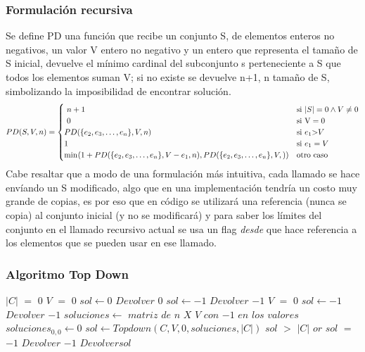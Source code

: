 \documentclass[8pt,a4paper]{article}
\begin{document}
\bigskip
\subsubsection{Formulación recursiva}
Se define PD una función que recibe un conjunto S, de elementos enteros no negativos, un valor V entero no negativo y un entero que representa el tamaño de S inicial, devuelve el mínimo cardinal del subconjunto s perteneciente a S que todos los elementos suman V; si no existe se devuelve n+1, n tamaño de S, simbolizando la imposibilidad de encontrar solución. \\
\[
\begin{array}{@{} r @{} c @{} l @{} }
&PD(S, V, n)&{}=\displaystyle
\begin{cases}
\ n+1 &\text{si } \text |S| = 0 \wedge V \neq 0 
\\
\ 0 &\text{si } \text V = 0 
\\
PD($\{$e_{2},e_{3},\dots,e_{n}$\}$,V,n)  &\text{si } e_{1} $>$ V
\\
1 &\text{si } e_{1} = V
\\
\min_{} (1 + PD($\{$e_{2},e_{3},\dots,e_{n}$\}$, V - e_{1}, n),PD($\{$e_{2},e_{3},\dots,e_{n}$\}$, V, ))&\text{otro caso }
\\
\end{cases}
\end{array}
\]
Cabe resaltar que a modo de una formulación más intuitiva, cada llamado se hace envíando un S modificado, algo que en una implementación tendría un costo muy grande de copias, es por eso que en código se utilizará una referencia (nunca se copia) al conjunto inicial (y no se modificará) y para saber los límites del conjunto en el llamado recursivo actual se usa un flag {\it desde} que hace referencia a los elementos que se pueden usar en ese llamado.
\subsubsection{Algoritmo Top Down}
\begin{codebox}
  \li \If $|C|$ $=$ $0$ \Then
  \li \If $V$ $=$ $0$ \Then
  	\li $sol \gets 0$
  	\li $Devolver$ $0$
  	\li \Else
  	\li $sol \gets -1$
  	\li $Devolver$ $-1$
  	\End
  \li \ElseIf $V$ $=$ $0$ \Then
  	 \li $sol \gets -1$
  	\li $Devolver$ $-1$
  \End
	\li $soluciones \gets$ $matriz$ $de$ $n$ $X$ $V$ $con$ $-1$ $en$ $los$ $valores$
	\li $soluciones_{0,0} \gets 0$
	\li $sol \gets Topdown(C,V,0,soluciones,|C|)$
	\li \If $sol$ $>$ $|C|$ $or$ $sol$ $=$ $-1$\Then
		\li $Devolver$ $-1$
		\li \Else
		\li $Devolver sol$
	\End

\end{codebox}
\end{document}
